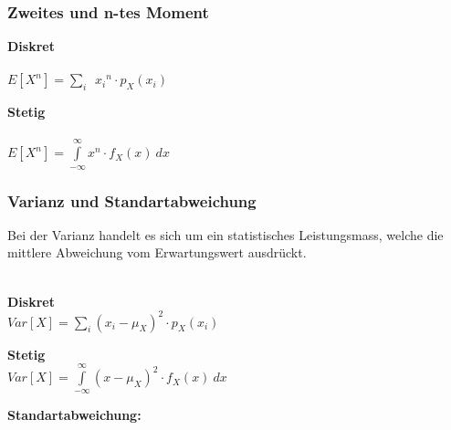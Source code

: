 \subsubsection{Zweites und n-tes Moment}
\begin{minipage}[t]{0.48\textwidth}
	\textbf{Diskret}\\
	\\[3pt]
	$E[X^n] = \sum\limits_{i}^{\quad}{x_i}^n \cdot p_X(x_i)$
\end{minipage} \hspace{0.04\textwidth}
\begin{minipage}[t]{0.48\textwidth}
	\textbf{Stetig}\\
	\\[3pt]
	$E[X^n] = \int\limits_{-\infty}^{\infty} x^n \cdot f_X(x) \: dx$
\end{minipage}

\subsubsection{Varianz und Standartabweichung}
Bei der Varianz handelt es sich um ein statistisches Leistungsmass, welche die mittlere Abweichung vom Erwartungswert ausdrückt.\\[3pt]
\\[5pt]
\begin{minipage}[t]{0.48\textwidth}
	\textbf{Diskret}\\
	$Var[X] = \sum\limits_{i}^{\,} (x_i -\mu_X)^2 \cdot p_X(x_i)$\\
\end{minipage} \hspace{0.04\textwidth}
\begin{minipage}[t]{0.48\textwidth}
	\textbf{Stetig}\\
	$Var[X] = \int\limits_{-\infty}^{\infty} (x -\mu_X)^2 \cdot f_X(x) \: dx$
\end{minipage}
\textbf{Standartabweichung:}\\

